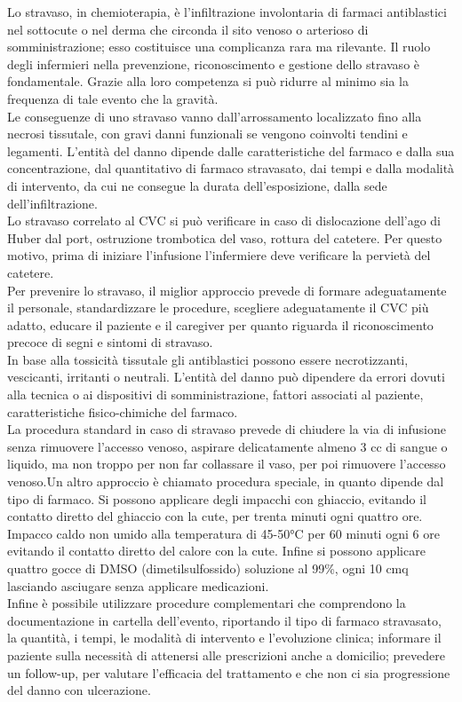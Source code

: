 Lo stravaso, in chemioterapia, è l’infiltrazione involontaria di farmaci antiblastici nel sottocute o nel derma che 
circonda il sito venoso o arterioso di somministrazione; esso costituisce una complicanza rara ma rilevante.
Il ruolo degli infermieri nella prevenzione, riconoscimento e gestione dello stravaso è fondamentale. Grazie alla 
loro competenza si può ridurre al minimo sia la frequenza di tale evento che la gravità.\\ Le conseguenze di uno 
stravaso vanno dall’arrossamento localizzato fino alla necrosi tissutale, con gravi danni funzionali se vengono 
coinvolti  tendini e legamenti. L’entità del danno dipende dalle caratteristiche del farmaco e dalla sua 
concentrazione, dal quantitativo di farmaco stravasato, dai tempi e dalla modalità di intervento, da cui ne consegue 
la durata dell’esposizione, dalla sede dell’infiltrazione\cite{STRAVASOTOSCANA}.\\
Lo stravaso correlato al CVC si può verificare in caso di dislocazione dell’ago di Huber dal port, ostruzione 
trombotica del vaso, rottura del catetere. Per questo motivo, prima di iniziare l’infusione l’infermiere deve 
verificare la pervietà del catetere.\\
Per prevenire lo stravaso, il miglior approccio prevede di formare adeguatamente il personale, standardizzare le 
procedure, scegliere adeguatamente il CVC più adatto, educare il paziente e il caregiver per quanto riguarda il 
riconoscimento precoce di segni e sintomi di stravaso\cite{AIOMCVC}.\\ 
In base alla tossicità tissutale gli antiblastici possono essere necrotizzanti, vescicanti, irritanti o neutrali.
L’entità del danno può dipendere da errori dovuti alla tecnica o ai dispositivi di somministrazione, 
fattori associati al paziente, caratteristiche fisico-chimiche del farmaco\cite{STRAVASOTOSCANA}.\\
La procedura standard in caso di stravaso prevede di chiudere la via di infusione senza rimuovere l’accesso venoso, 
aspirare delicatamente almeno 3 cc di sangue o liquido, ma non troppo per non far collassare il vaso, per poi 
rimuovere l’accesso venoso.Un altro approccio è chiamato procedura speciale, in quanto dipende dal tipo di farmaco. 
Si possono applicare degli impacchi con ghiaccio, evitando il contatto diretto del ghiaccio con la cute, per trenta 
minuti ogni quattro ore. Impacco caldo non umido alla temperatura di 45-50°C per 60 minuti ogni 6 ore evitando il 
contatto diretto del calore con la cute. Infine si possono applicare quattro gocce di DMSO (dimetilsulfossido) 
soluzione al 99\%, ogni 10 cmq lasciando asciugare senza applicare medicazioni\cite{STRAVASOTOSCANA}.\\ 
Infine è possibile utilizzare procedure complementari che comprendono la documentazione in cartella dell’evento, 
riportando il tipo di farmaco stravasato, la quantità, i tempi, le modalità di intervento e l’evoluzione clinica; 
informare il paziente sulla necessità di attenersi alle prescrizioni anche a domicilio; prevedere un follow-up, 
per valutare l'efficacia del trattamento e che non ci sia progressione del danno con ulcerazione\cite{STRAVASOTOSCANA}.\\


